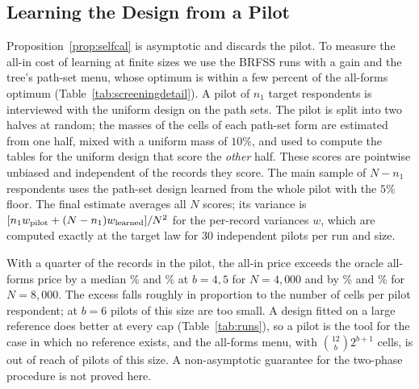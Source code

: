 \subsection{Learning the Design from a Pilot}\label{app:pilot}
Proposition~\ref{prop:selfcal} is asymptotic and discards the pilot. To measure the all-in cost of learning at finite sizes we use the BRFSS runs with a gain and the tree's path-set menu, whose optimum is within a few percent of the all-forms optimum (Table~\ref{tab:screeningdetail}). A pilot of $n_1$ target respondents is interviewed with the uniform design on the path sets. The pilot is split into two halves at random; the masses of the cells of each path-set form are estimated from one half, mixed with a uniform mass of $10\%$, and used to compute the tables for the uniform design that score the \emph{other} half. These scores are pointwise unbiased and independent of the records they score. The main sample of $N-n_1$ respondents uses the path-set design learned from the whole pilot with the $5\%$ floor. The final estimate averages all $N$ scores; its variance is $[n_1w_{\rm pilot}+(N-n_1)w_{\rm learned}]/N^2$ for the per-record variances $w$, which are computed exactly at the target law for 30 independent pilots per run and size.

With a quarter of the records in the pilot, the all-in price exceeds the oracle all-forms price by a median \nAllInOverFourc\% and \nAllInOverFivec\% at $b=4,5$ for $N=4{,}000$ and by \nAllInOverFourd\% and \nAllInOverFived\% for $N=8{,}000$. The excess falls roughly in proportion to the number of cells per pilot respondent; at $b=6$ pilots of this size are too small. A design fitted on a large reference does better at every cap (Table~\ref{tab:runs}), so a pilot is the tool for the case in which no reference exists, and the all-forms menu, with $\binom{12}b2^{b+1}$ cells, is out of reach of pilots of this size. A non-asymptotic guarantee for the two-phase procedure is not proved here.

